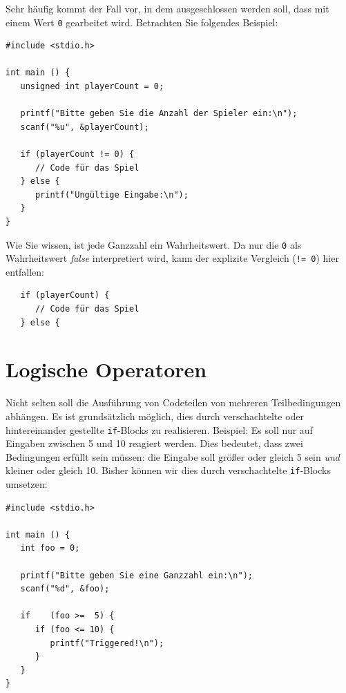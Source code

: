 \begin{hintbox}
Sehr häufig kommt der Fall vor, in dem ausgeschlossen werden soll, dass mit einem Wert \texttt{0} gearbeitet wird. Betrachten Sie folgendes Beispiel:

\begin{codebox}
\begin{verbatim}
#include <stdio.h>

int main () {
   unsigned int playerCount = 0;
   
   printf("Bitte geben Sie die Anzahl der Spieler ein:\n");
   scanf("%u", &playerCount);
   
   if (playerCount != 0) {
      // Code für das Spiel
   } else {
      printf("Ungültige Eingabe:\n");
   }
}
\end{verbatim}
\end{codebox}
\end{hintbox}
%
\begin{hintbox}[]
Wie Sie wissen, ist jede Ganzzahl ein Wahrheitswert. Da nur die \texttt{0} als Wahrheitswert \emph{false} interpretiert wird, kann der explizite Vergleich (\texttt{!= 0}) hier entfallen:

\begin{codebox}
\begin{verbatim}
   if (playerCount) {
      // Code für das Spiel
   } else {
\end{verbatim}
\end{codebox}
\end{hintbox}

\section{Logische Operatoren} \label{sec:OperatorsLogical}
Nicht selten soll die Ausführung von Codeteilen von mehreren Teilbedingungen abhängen. Es ist grundsätzlich möglich, dies durch verschachtelte oder hintereinander gestellte \texttt{if}-Blocks zu realisieren. Beispiel: Es soll nur auf Eingaben zwischen 5 und 10 reagiert werden. Dies bedeutet, dass zwei Bedingungen erfüllt sein müssen: die Eingabe soll größer oder gleich 5 sein \emph{und} kleiner oder gleich 10. Bisher können wir dies durch verschachtelte \texttt{if}-Blocks umsetzen:

\begin{codebox}
\begin{verbatim}
#include <stdio.h>

int main () {
   int foo = 0;
   
   printf("Bitte geben Sie eine Ganzzahl ein:\n");
   scanf("%d", &foo);

   if    (foo >=  5) {
      if (foo <= 10) {
         printf("Triggered!\n");
      }
   }
}
\end{verbatim}
\end{codebox}

